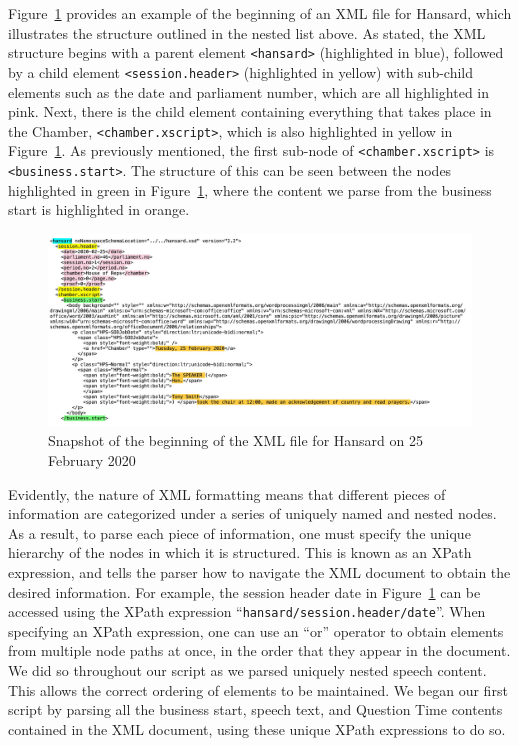 \documentclass[
  letterpaper,
  DIV=11,
  numbers=noendperiod]{scrartcl}
\begin{document}
Figure~\ref{fig-xml1} provides an example of the beginning of an XML
file for Hansard, which illustrates the structure outlined in the nested
list above. As stated, the XML structure begins with a parent element
\texttt{\textless{}hansard\textgreater{}} (highlighted in blue),
followed by a child element
\texttt{\textless{}session.header\textgreater{}} (highlighted in yellow)
with sub-child elements such as the date and parliament number, which
are all highlighted in pink. Next, there is the child element containing
everything that takes place in the Chamber,
\texttt{\textless{}chamber.xscript\textgreater{}}, which is also
highlighted in yellow in Figure~\ref{fig-xml1}. As previously mentioned,
the first sub-node of \texttt{\textless{}chamber.xscript\textgreater{}}
is \texttt{\textless{}business.start\textgreater{}}. The structure of
this can be seen between the nodes highlighted in green in
Figure~\ref{fig-xml1}, where the content we parse from the business
start is highlighted in orange.

\begin{figure}

{\centering \includegraphics{xml1.jpg}

}

\caption{\label{fig-xml1}Snapshot of the beginning of the XML file for
Hansard on 25 February 2020}

\end{figure}

Evidently, the nature of XML formatting means that different pieces of
information are categorized under a series of uniquely named and nested
nodes. As a result, to parse each piece of information, one must specify
the unique hierarchy of the nodes in which it is structured. This is
known as an XPath expression, and tells the parser how to navigate the
XML document to obtain the desired information. For example, the session
header date in Figure~\ref{fig-xml1} can be accessed using the XPath
expression ``\texttt{hansard/session.header/date}''. When specifying an
XPath expression, one can use an ``or'' operator to obtain elements from
multiple node paths at once, in the order that they appear in the
document. We did so throughout our script as we parsed uniquely nested
speech content. This allows the correct ordering of elements to be
maintained. We began our first script by parsing all the business start,
speech text, and Question Time contents contained in the XML document,
using these unique XPath expressions to do so.
\end{document}
